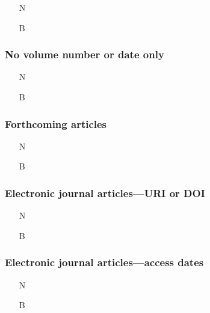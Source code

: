 \documentclass[11pt,letterpaper,oneside]{article}
\begin{document}
\begin{itemize}
\item[N] 

\item[B] 
\end{itemize}

\setcounter{subsubsection}{180}
\subsubsection{No volume number or date only}

\begin{itemize}
\item[N] 

\item[B] 
\end{itemize}

\subsubsection{Forthcoming articles}

\begin{itemize}
\item[N] 

\item[B] 
\end{itemize}

\setcounter{subsubsection}{183}
\subsubsection{Electronic journal articles---URI or DOI}

\begin{itemize}
\item[N] 

\item[B] 
\end{itemize}

\subsubsection{Electronic journal articles---access dates}

\begin{itemize}
\item[N] 

\item[B] 
\end{itemize}
\end{document}
